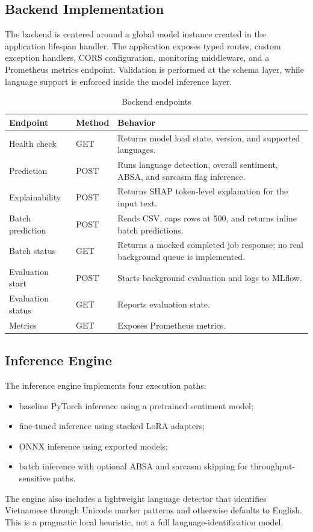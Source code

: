 \documentclass[12pt, a4paper]{article}
\begin{document}
\subsection{Backend Implementation}
The backend is centered around a global model instance created in the application lifespan handler. The application exposes typed routes, custom exception handlers, CORS configuration, monitoring middleware, and a Prometheus metrics endpoint. Validation is performed at the schema layer, while language support is enforced inside the model inference layer.

\begin{table}[H]
\centering
\caption{Backend endpoints}
\begin{tabularx}{\textwidth}{@{} p{3.2cm} p{2.4cm} X @{}}
\toprule
\textbf{Endpoint} & \textbf{Method} & \textbf{Behavior} \\
\midrule
Health check & GET & Returns model load state, version, and supported languages. \\
Prediction & POST & Runs language detection, overall sentiment, ABSA, and sarcasm flag inference. \\
Explainability & POST & Returns SHAP token-level explanation for the input text. \\
Batch prediction & POST & Reads CSV, caps rows at 500, and returns inline batch predictions. \\
Batch status & GET & Returns a mocked completed job response; no real background queue is implemented. \\
Evaluation start & POST & Starts background evaluation and logs to MLflow. \\
Evaluation status & GET & Reports evaluation state. \\
Metrics & GET & Exposes Prometheus metrics. \\
\bottomrule
\end{tabularx}
\end{table}

\subsection{Inference Engine}
The inference engine implements four execution paths:
\begin{itemize}[noitemsep]
  \item baseline PyTorch inference using a pretrained sentiment model;
  \item fine-tuned inference using stacked LoRA adapters;
  \item ONNX inference using exported models;
  \item batch inference with optional ABSA and sarcasm skipping for throughput-sensitive paths.
\end{itemize}
The engine also includes a lightweight language detector that identifies Vietnamese through Unicode marker patterns and otherwise defaults to English. This is a pragmatic local heuristic, not a full language-identification model.
\end{document}
